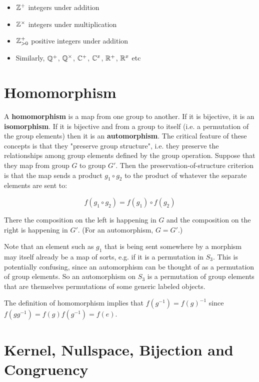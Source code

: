 \begin{itemize}
\item $\mathbb{Z}^+$ integers under addition

\item $\mathbb{Z}^\times$ integers under multiplication

\item $\mathbb{Z}_{>0}^+$ positive integers under addition

\item Similarly, $\mathbb{Q}^+$, $\mathbb{Q}^\times$, $\mathbb{C}^+$, $\mathbb{C}^x$, $\mathbb{R}^+$, $\mathbb{R}^x$ etc

\end{itemize}

\section{Homomorphism}
A \textbf{homomorphism} is a map from one group to another. If it is bijective,
it is an \textbf{isomorphism}. If it is bijective and from a group to itself
(i.e. a permutation of the group elements) then it is an
\textbf{automorphism}. The critical feature of these concepts is that they
"preserve group structure", i.e. they preserve the relationships among group
elements defined by the group operation. Suppose that they map from group $G$
to group $G'$. Then the preservation-of-structure criterion is that the map
sends a product $g_1 \circ g_2$ to the product of whatever the separate
elements are sent to:

$$
f(g_1 \circ g_2) = f(g_1) \circ f(g_2)
$$

There the composition on the left is happening in $G$ and the composition on
the right is happening in $G'$. (For an automorphism, $G=G'$.)

Note that an element such as $g_1$ that is being sent somewhere by a morphism
may itself already be a map of sorts, e.g. if it is a permutation in
$S_3$. This is potentially confusing, since an automorphism can be thought of
as a permutation of group elements. So an automorphism on $S_3$ is a
permutation of group elements that are themselves permutations of some generic
labeled objects.

The definition of homomorphism implies that $f(g^{-1}) = f(g)^{-1}$ since
$f(gg^{-1}) = f(g)f(g^{-1}) = f(e)$.

\section{Kernel, Nullspace, Bijection and Congruency}

